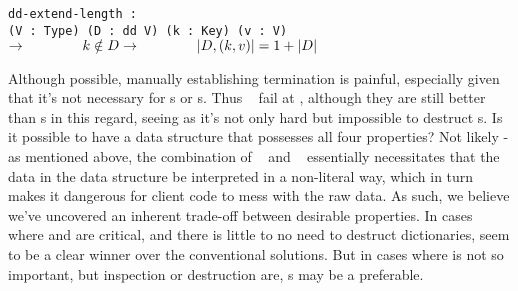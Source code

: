 \texttt{dd-extend-length :\\
\phantom{xxxxx} (V : Type) (D : dd V) (k : Key) (v : V) $\rightarrow \\
\phantom{xxxxxxx} k \notin D \rightarrow \\
\phantom{xxxxxxx} |D, (k, v)| = 1 + |D|$}

Although possible, manually establishing termination is painful, especially given that it's not necessary
for {\sal}s or {\cal}s. Thus \dds~ fail at \EzDstr, although they are still better than {\fpf}s in this
regard, seeing as it's not only hard but impossible to destruct {\fpf}s. Is it possible to have a data
structure that possesses all four properties? Not likely - as mentioned above, the combination of
\SemInj~ and \SemTot~ essentially
necessitates that the data in the data structure be interpreted in a non-literal way, which in turn
makes it dangerous for client code to mess with the raw data. As such, we believe we've uncovered an
inherent trade-off between desirable properties. In cases where \SemTot{} and \EqDec{} are critical,
and there is little to no need to destruct dictionaries, \dds{} seem to be a clear winner over
the conventional solutions. But in cases where \SemTot{} is not so important,
but inspection or destruction are, {\CAL}s may be a preferable.
